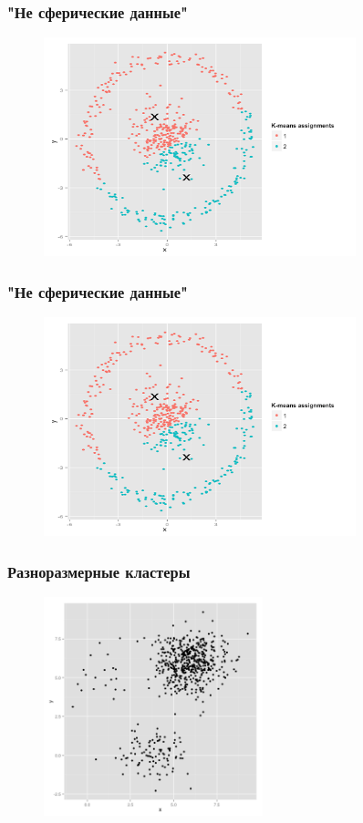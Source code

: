 \documentclass[12pt]{beamer}
\begin{document}
\begin{frame}\frametitle{"Не сферические данные"}
\begin{figure}[htbp]
  \includegraphics[height=180pt, keepaspectratio = true]{images/non_spherical-2}  
\end{figure}
\end{frame}

\begin{frame}\frametitle{"Не сферические данные"}
\begin{figure}[htbp]
  \includegraphics[height=180pt, keepaspectratio = true]{images/non_spherical-2}  
\end{figure}
\end{frame}

\begin{frame}\frametitle{Разноразмерные кластеры}
\begin{figure}[htbp]
  \includegraphics[height=180pt, keepaspectratio = true]{images/different_sizes-1}  
\end{figure}
\end{frame}
\end{document}
